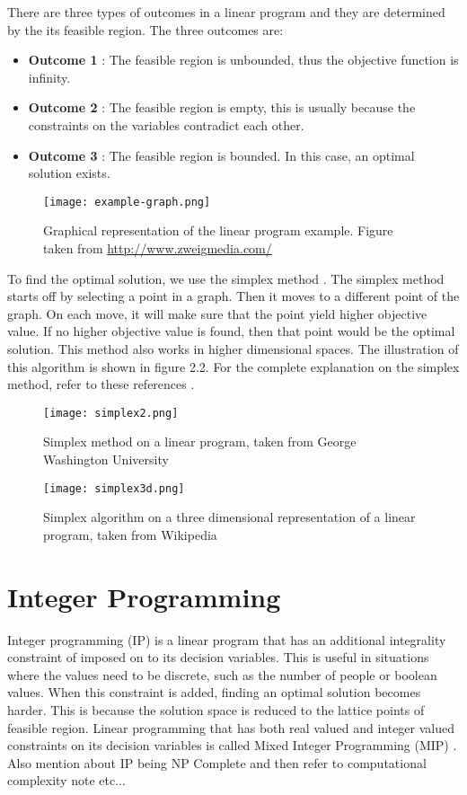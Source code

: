 There are three types of outcomes \cite{LPChvatal,ILPCoursera} in a linear program and they are determined by the
its feasible region. The three outcomes are:
\begin{itemize}
\item \textbf{Outcome 1} : The feasible region is unbounded, thus the objective function is infinity.
\item \textbf{Outcome 2} : The feasible region is empty, this is usually because the constraints on the variables contradict each other.
\item \textbf{Outcome 3} : The feasible region is bounded. In this case, an optimal solution exists.
\end{itemize}

\begin{figure}[!ht]
  \centering
    \texttt{[image: example-graph.png]}
    \caption{Graphical representation of the linear program example. Figure taken from \url{http://www.zweigmedia.com/}\cite{zweigmedia}}
\end{figure}

To find the optimal solution, we use the simplex method \cite{LPChvatal, LPVanderbei}. The simplex method starts off by selecting a point in a graph.
Then it moves to a different point of the graph. On each move, it will make sure that the point yield higher
objective value. If no higher objective value is found, then that point would be the
optimal solution. This method also works in higher dimensional spaces. The illustration of this algorithm is shown in figure 2.2.
For the complete explanation on the simplex method, refer to these references \cite{LPChvatal, LPVanderbei}.

\begin{figure}[!ht]
  \centering
    \texttt{[image: simplex2.png]}
    \caption{Simplex method on a linear program, taken from George Washington University \cite{seas:SM}}
    \vspace{1cm}
    \texttt{[image: simplex3d.png]}
    \caption{Simplex algorithm on a three dimensional representation of a linear program, taken from Wikipedia \cite{Wiki:SPM}}
    \vspace{1cm}
\end{figure}

\section{Integer Programming}
Integer programming (IP) \cite{LPVanderbei} is a linear program that has an additional
integrality constraint of imposed on to its decision variables. This is useful in situations where the values need to be
discrete, such as the number of people or boolean values.
When this constraint is added, finding an optimal solution becomes harder. This is because the solution space is reduced to
the lattice points of feasible region. Linear programming that has both real valued and integer valued constraints on its
 decision variables is called Mixed Integer Programming (MIP) \cite{LPVanderbei}.
Also mention about IP being NP Complete and then refer to computational complexity note etc...

